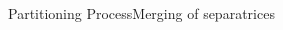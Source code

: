 \documentclass[compress,10pt,aspectratio=169]{beamer}
\begin{document}
\begin{frame}{Partitioning Process}{Merging of separatrices}
\begin{columns}
\begin{column}{0.4\textwidth}
\vspace{0.5cm}
\end{column}
\end{columns}
\end{frame}
\end{document}
